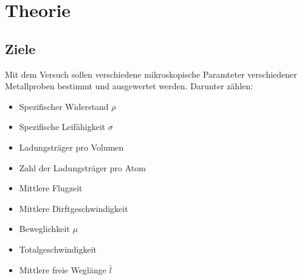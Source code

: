\newpage
\section{Theorie}
\label{sec:theorie}


\subsection{Ziele}
Mit dem Versuch sollen verschiedene mikroskopische Paramteter verschiedener Metallproben bestimmt und ausgewertet werden.
Darunter zählen:\\
\begin{itemize}\itemsep0pt
    \item Spezifischer Widerstand $\rho$
    \item Spezifische Leifähigkeit $\sigma$
    \item Ladungsträger pro Volumen
    \item Zahl der Ladungsträger pro Atom
    \item Mittlere Flugzeit
    \item Mittlere Dirftgeschwindigkeit
    \item Beweglichkeit $\mu$
    \item Totalgeschwindigkeit
    \item Mittlere freie Weglänge $\bar{l}$
\end{itemize}
